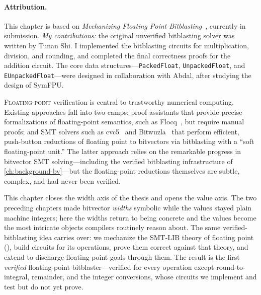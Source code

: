 
\paragraph*{Attribution.} This chapter is based on \emph{Mechanizing Floating
Point Bitblasting}~\citep{bhat2027floatingpoint}, currently in submission.
\emph{My contributions:} the original unverified bitblasting solver was written
by Tunan Shi. I implemented the bitblasting circuits for multiplication,
division, and rounding, and completed the final correctness proofs for the
addition circuit. The core data structures---\texttt{PackedFloat},
\texttt{UnpackedFloat}, and \texttt{EUnpackedFloat}---were designed in
collaboration with Abdal, after studying the design of SymFPU.

\lettrine{F}{loating-point} verification is central to trustworthy numerical
computing. Existing approaches fall into two camps: proof assistants that
provide precise formalizations of floating-point semantics, such as
Flocq~\citep{boldo2011flocq}, but require manual proofs; and SMT solvers such
as cvc5~\citep{barbosa2022cvc5} and Bitwuzla~\citep{niemetz2023bitwuzla} that
perform efficient, push-button reductions of floating point to bitvectors via
bitblasting with a ``soft floating-point unit.'' The latter approach relies
on the remarkable progress in bitvector SMT solving---including the verified
bitblasting infrastructure of \cref{ch:background-bv}---but the floating-point
reductions themselves are subtle, complex, and had never been verified.

This chapter closes the width axis of the thesis and opens the value axis. The
two preceding chapters made bitvector \emph{widths} symbolic while the values
stayed plain machine integers; here the widths return to being concrete and the
values become the most intricate objects compilers routinely reason about. The
same verified-bitblasting idea carries over: we mechanize the SMT-LIB theory of
floating point (\qffp{}), build circuits for its operations, prove them correct
against that theory, and extend \bvdecide{} to discharge floating-point goals
through them. The result is the first \emph{verified} floating-point
bitblaster---verified for every \qffp{} operation except round-to-integral,
remainder, and the integer conversions, whose circuits we implement and test but
do not yet prove.

